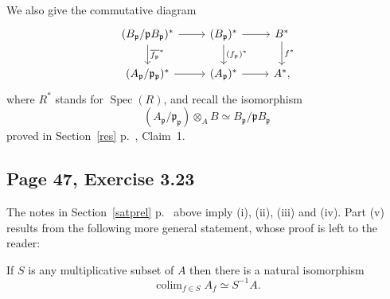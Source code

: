 \documentclass[parskip=half,fontsize=12pt]{scrartcl}%
\newcommand{\mf}{\mathfrak}
\newcommand{\aaa}{\mf a}
\newcommand{\bbb}{\mf b}
\newcommand{\ppp}{\mf p}
\DeclareMathOperator*{\colim}{colim}
\newcommand{\Spec}{\operatorname{Spec}}\newcommand{\Sp}{\operatorname{Spec}}
\newtheorem{note}[thm]{Note}
\begin{document}
We also give the commutative diagram
$$
\begin{tikzcd}
(B_\ppp/\ppp B_\ppp)^*\ar[d,"\overline{f_\ppp}^*"]\ar[r]&(B_\ppp)^*\ar[d,"(f_\ppp)^*"]\ar[r]& B^*\ar[d,"f^*"]\\ 
(A_\ppp/\ppp_\ppp)^*\ar[r]&(A_\ppp)^*\ar[r]& A^*,
\end{tikzcd}
$$ 
where $R^*$ stands for $\Spec(R)$, and recall the isomorphism 
$$
(A_\ppp/\ppp_\ppp)\otimes_AB\simeq B_\ppp/\ppp B_\ppp
$$ 
proved in Section~\ref{res} p.~\pageref{res}, Claim~1. 

\subsection{Page 47, Exercise 3.23}%

\begin{comment}
\begin{note}\label{sheaf}
Let $f,g\in A$. Then there is at most one $A$-algebra morphism from $A_f$ to $A_g$. Moreover such a morphism exists if and only if $f/1$ is a unit of $A_g$, that is if and only if $f/1$ is contained in no prime prime ideal of $A_g$, that is if and only if $g\notin\ppp$ implies $f\notin\ppp$ for all prime ideal $\ppp$ of $A$, that is if and only if $X_g\subset X_f$. 
\end{note}
\end{comment}

The notes in Section~\ref{satprel} p.~\pageref{satprel} above %
imply (i), (ii), (iii) and (iv). Part (v) results from the following more general statement, whose proof is left to the reader:

If $S$ is any multiplicative subset of $A$ then there is a natural isomorphism 
$$
\colim_{f\in S}A_f\simeq S^{-1}A.
$$


\begin{comment}
It seems simpler to proceed as follows:

For $f\in A$ put 
$$
S(f):=A\ \setminus\ \bigcup_{\ppp\notni f}\ \ppp,
$$ 
where it is understood that $\ppp$ is in $X$. Note that $S(f)$ is a multiplicatively closed set depending only on $X_f$, not on $f$. Finally put 
$$
A(X_f):=S(f)^{-1}A.
$$ 
Here is a mild generalization: 

For each radical ideal $\aaa$ of $A$ put 
$$
S_\aaa:=A\ \setminus\ \bigcup_{\ppp\not\supset\aaa}\ \ppp.
$$ 
This is multiplicatively closed. For $\aaa\subset\bbb$ we have a natural morphism $S_{\bbb}^{-1}A\to S_\aaa^{-1}A$. We also have a canonical isomorphism 
$$
\colim_{\aaa\not\subset\ppp}S_\aaa^{-1}A\simeq A_\ppp.
$$
\end{comment}
\end{document}
